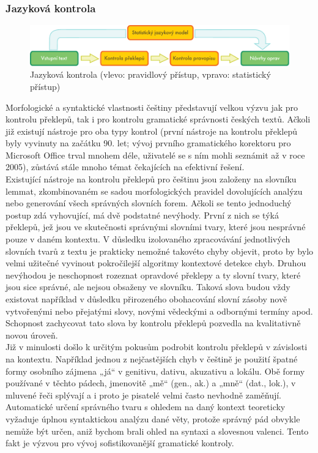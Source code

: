 \begin{multicols}{2}
\subsubsection{Jazyková kontrola}
\begin{figure}[t]
  \center
  \includegraphics[width=\textwidth]{../_media/czech/language_checking}
  \caption{Jazyková kontrola (vlevo: pravidlový přístup, vpravo: statistický přístup)}
  \label{fig:langcheckingaarch_en}
\end{figure}
Morfologické a syntaktické vlastnosti češtiny představují velkou výzvu jak pro kontrolu překlepů, tak i pro kontrolu gramatické správnosti českých textů. Ačkoli již existují nástroje pro oba typy kontrol (první nástroje na kontrolu překlepů byly vyvinuty na začátku 90. let; vývoj prvního gramatického korektoru pro Microsoft Office trval mnohem déle, uživatelé se s ním mohli seznámit až v roce 2005), zůstává stále mnoho témat čekajících na efektivní řešení.\\
Existující nástroje na kontrolu překlepů pro češtinu jsou založeny na slovníku lemmat, zkombinovaném se sadou morfologických pravidel dovolujících analýzu nebo generování všech správných slovních forem. Ačkoli se tento jednoduchý postup zdá vyhovující, má dvě podstatné nevýhody. První z nich se týká překlepů, jež jsou ve skutečnosti správnými slovními tvary, které jsou nesprávné pouze v daném kontextu. V důsledku izolovaného zpracovávání jednotlivých slovních tvarů z textu je prakticky nemožné takovéto chyby objevit, proto by bylo velmi užitečné vyvinout pokročilejší algoritmy kontextové detekce chyb. Druhou nevýhodou je neschopnost rozeznat opravdové překlepy a ty slovní tvary, které jsou sice správné, ale nejsou obsaženy ve slovníku. Taková slova budou vždy existovat například v důsledku přirozeného obohacování slovní zásoby nově vytvořenými nebo přejatými slovy, novými vědeckými a odbornými termíny apod. Schopnost zachycovat tato slova by kontrolu překlepů pozvedla na kvalitativně novou úroveň.\\
Již v minulosti došlo k určitým pokusům podrobit kontrolu překlepů v závislosti na kontextu. Například jednou z nejčastějších chyb v češtině je použití špatné formy osobního zájmena „já“ v genitivu, dativu, akuzativu a lokálu. Obě formy používané v těchto pádech, jmenovitě „mě“ (gen., ak.) a „mně“ (dat., lok.), v mluvené řeči splývají a i proto je pisatelé velmi často nevhodně zaměňují. Automatické určení správného tvaru s ohledem na daný kontext teoreticky vyžaduje úplnou syntaktickou analýzu dané věty, protože správný pád obvykle nemůže být určen, aniž bychom brali ohled na syntaxi a slovesnou valenci. Tento fakt je výzvou pro vývoj sofistikovanější gramatické kontroly.\\

\end{multicols}
